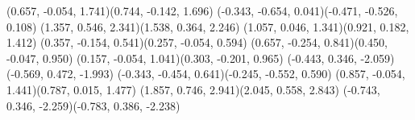 \pstThreeDLine[linecolor=black](0.657, -0.054, 1.741)(0.744, -0.142, 1.696)
\pstThreeDLine[linecolor=gray](-0.343, -0.654, 0.041)(-0.471, -0.526, 0.108)
\pstThreeDLine[linecolor=black](1.357, 0.546, 2.341)(1.538, 0.364, 2.246)
\pstThreeDLine[linecolor=gray](1.057, 0.046, 1.341)(0.921, 0.182, 1.412)
\pstThreeDLine[linecolor=gray](0.357, -0.154, 0.541)(0.257, -0.054, 0.594)
\pstThreeDLine[linecolor=gray](0.657, -0.254, 0.841)(0.450, -0.047, 0.950)
\pstThreeDLine[linecolor=black](0.157, -0.054, 1.041)(0.303, -0.201, 0.965)
\pstThreeDLine[linecolor=gray](-0.443, 0.346, -2.059)(-0.569, 0.472, -1.993)
\pstThreeDLine[linecolor=black](-0.343, -0.454, 0.641)(-0.245, -0.552, 0.590)
\pstThreeDLine[linecolor=gray](0.857, -0.054, 1.441)(0.787, 0.015, 1.477)
\pstThreeDLine[linecolor=black](1.857, 0.746, 2.941)(2.045, 0.558, 2.843)
\pstThreeDLine[linecolor=gray](-0.743, 0.346, -2.259)(-0.783, 0.386, -2.238)
